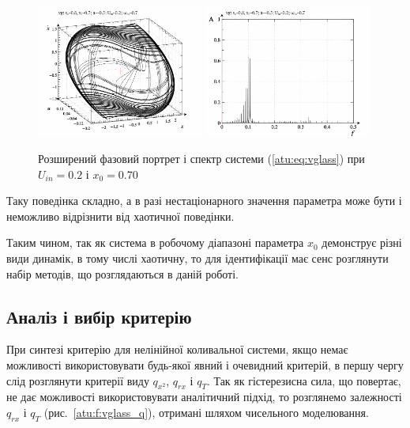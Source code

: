 \begin{figure}[ht!]
\begin{center}
  \includegraphics[width=0.49\textwidth]{p/cha/vg/vg_0-p_phe_0x20_0x70_0x70.png}
  \hfill
  \includegraphics[width=0.49\textwidth]{p/cha/vg/vg_fft-p_f_0x20_0x70_0x70.png}
\end{center}
\caption{Розширений фазовий портрет і спектр системи (\ref{atu:eq:vglass}) при $ U_{in} = 0.2 $ і $ x_0 = 0.70 $}
\label{atu:f:vglass_phase_f_u12}
\end{figure}

Таку поведінка складно, а в разі нестаціонарного значення
параметра може бути і неможливо відрізнити від хаотичної
поведінки.

Таким чином, так як система в робочому діапазоні параметра
$ x_0 $ демонструє різні види динамік, в тому числі хаотичну,
то для ідентифікації має сенс розглянути набір методів, що
розглядаються в даній роботі.


\subsection{Аналіз і вибір критерію} %

При синтезі критерію для нелінійної коливальної системи, якщо
немає можливості використовувати будь-якої явний і очевидний
критерій, в першу чергу слід розглянути критерії виду
$q_{x^2} $,
$q_{rx} $ і
$q_T$. Так як гістерезисна сила, що повертає, не дає можливості
використовувати аналітичний підхід, то розглянемо залежності
$ q_{rx} $ і
$ q_T $ (рис.~\ref{atu:f:vglass_q}), отримані шляхом чисельного моделювання.

